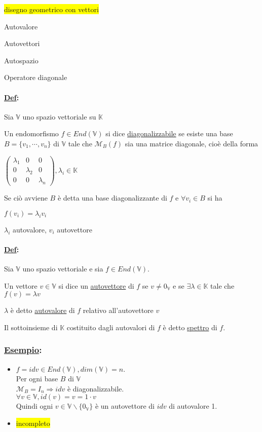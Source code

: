 \documentclass{article}
\newcommand{\hl}[1]{\colorbox{yellow}{#1}}
\newcommand{\ul}[1]{\underline{#1}}
\newcommand{\K}{\mathbb{K}}
\newcommand{\V}{\mathbb{V}}
\newcommand{\M}{\mathcal{M}}
\newcommand{\Def}[2]{\paragraph{\ul{Def}:}#1\\\hspace*{3em}\begin{minipage}{.8\textwidth}#2\end{minipage}}
\newcommand{\Esempio}[1]{\subsubsection*{\ul{Esempio}:}#1}
\begin{document}
	\hl{disegno geometrico con vettori}

	Autovalore

	Autovettori

	Autospazio

	Operatore diagonale



	\Def{Sia $\V$ uno spazio vettoriale su $\K$}{
		Un endomorfismo $f\in End(\V)$ si dice \ul{diagonalizzabile} se esiste una base $B=\{v_1,\cdots,v_n\}$ di $\V$ tale che $\M_B(f)$ sia una matrice diagonale, cioè della forma

		$\begin{pmatrix}
				\lambda_1 & 0         & 0         \\
				0         & \lambda_2 & 0         \\
				0         & 0         & \lambda_n
			\end{pmatrix},\lambda_i\in\K$

		Se ciò avviene $B$ è detta una base diagonalizzante di $f$ e $\forall v_i\in B$ si ha

		$f(v_i)=\lambda_iv_i$

		$\lambda_i$ autovalore, $v_i$ autovettore
	}

	\Def{Sia $\V$ uno spazio vettoriale e sia $f\in End(\V)$.}{
		Un vettore $v\in\V$ si dice un \ul{autovettore} di $f$ se $v\not=0_\V$ e se $\exists\lambda\in\K$ tale che $f(v)=\lambda v$

		$\lambda$ è detto \ul{autovalore} di $f$ relativo all'autovettore $v$

		Il sottoinsieme di $\K$ costituito dagli autovalori di $f$ è detto \ul{spettro} di $f$.
	}

	\Esempio{
		\begin{itemize}
			\item $f=idv\in End(\V),dim(\V)=n$.\\
			      Per ogni base $B$ di $\V$\\
			      $\M_B=I_n\Rightarrow idv$ è diagonalizzabile.\\
			      $\forall v\in\V, id(v)=v=1\cdot v$\\
			      Quindi ogni $v\in\V\backslash\{0_\V\}$ è un autovettore di $idv$ di autovalore 1.
			\item \hl{incompleto}
		\end{itemize}
	}
\end{document}
